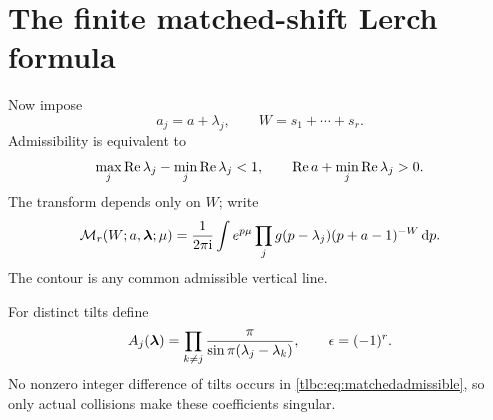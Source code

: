 \documentclass[11pt,letterpaper]{article}
\numberwithin{equation}{section}
\theoremstyle{definition}\newtheorem{definition}[theorem]{Definition}
\theoremstyle{remark}\newtheorem{remark}[theorem]{Remark}
\newcommand{\dd}{\,\mathrm d}\newcommand{\ii}{\mathrm i}
\newcommand{\M}{\mathcal M}\newcommand{\T}{\mathcal T}\newcommand{\K}{\mathcal K}
\begin{document}
\section{The finite matched-shift Lerch formula}
\label{tlbc:sec:finite}
Now impose
\begin{equation}\label{tlbc:eq:matched}
 a_j=a+\lambda_j,\qquad W=s_1+\cdots+s_r.
\end{equation}
Admissibility is equivalent to
\begin{equation}\label{tlbc:eq:matchedadmissible}
 \max_j\operatorname{Re}\lambda_j-\min_j\operatorname{Re}\lambda_j<1,
 \qquad \operatorname{Re} a+\min_j\operatorname{Re}\lambda_j>0.
\end{equation}
The transform depends only on $W$; write
\begin{equation}\label{tlbc:eq:Mcontour}
 \M_r(W;a,\bl;\mu)=\frac1{2\pi\ii}\int
 e^{p\mu}\prod_j g(p-\lambda_j)(p+a-1)^{-W}\dd p.
\end{equation}
The contour is any common admissible vertical line.

For distinct tilts define
\begin{equation}\label{tlbc:eq:weights}
 A_j(\boldsymbol\lambda)=\prod_{k\ne j}\frac{\pi}{\sin\pi(\lambda_j-\lambda_k)},
 \qquad \epsilon=(-1)^r.
\end{equation}
No nonzero integer difference of tilts occurs in \eqref{tlbc:eq:matchedadmissible}, so only actual collisions make these coefficients singular.
\end{document}
